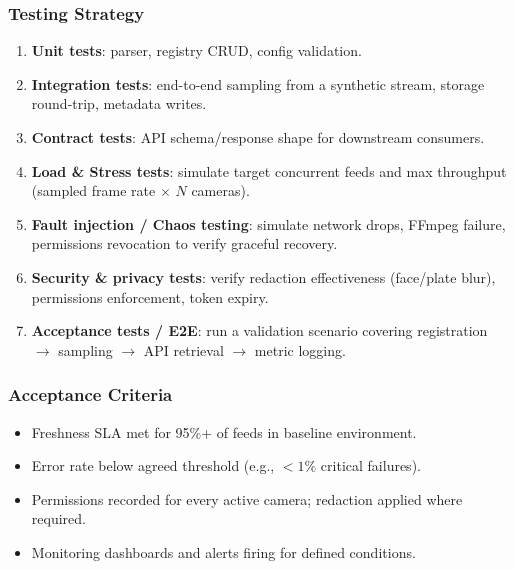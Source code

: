 \subsubsection{Testing Strategy}
\begin{enumerate}
  \item \textbf{Unit tests}: parser, registry CRUD, config validation.
  \item \textbf{Integration tests}: end-to-end sampling from a synthetic stream, storage round-trip, metadata writes.
  \item \textbf{Contract tests}: API schema/response shape for downstream consumers.
  \item \textbf{Load \& Stress tests}: simulate target concurrent feeds and max throughput (sampled frame rate $\times$ $N$ cameras).
  \item \textbf{Fault injection / Chaos testing}: simulate network drops, FFmpeg failure, permissions revocation to verify graceful recovery.
  \item \textbf{Security \& privacy tests}: verify redaction effectiveness (face/plate blur), permissions enforcement, token expiry.
  \item \textbf{Acceptance tests / E2E}: run a validation scenario covering registration $\rightarrow$ sampling $\rightarrow$ API retrieval $\rightarrow$ metric logging.
\end{enumerate}

\subsubsection{Acceptance Criteria}
\begin{itemize}
  \item Freshness SLA met for 95\%+ of feeds in baseline environment.
  \item Error rate below agreed threshold (e.g., $<1\%$ critical failures).
  \item Permissions recorded for every active camera; redaction applied where required.
  \item Monitoring dashboards and alerts firing for defined conditions.
\end{itemize}

